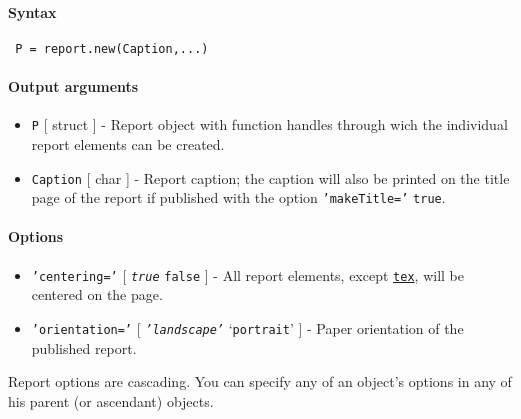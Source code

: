 


	\paragraph{Syntax}
 
 \begin{verbatim}
 P = report.new(Caption,...)
 \end{verbatim}
 
 \paragraph{Output arguments}
 
 \begin{itemize}
 \item
   \texttt{P} {[} struct {]} - Report object with function handles
   through wich the individual report elements can be created.
 \item
   \texttt{Caption} {[} char {]} - Report caption; the caption will also
   be printed on the title page of the report if published with the
   option \texttt{'makeTitle='} \texttt{true}.
 \end{itemize}
 
 \paragraph{Options}
 
 \begin{itemize}
 \item
   \texttt{'centering='} {[} \emph{\texttt{true}} \textbar{}
   \texttt{false} {]} - All report elements, except
   \href{report/tex}{\texttt{tex}}, will be centered on the page.
 \item
   \texttt{'orientation='} {[} \emph{\texttt{'landscape'}} \textbar{}
   `\texttt{portrait}' {]} - Paper orientation of the published report.
 \end{itemize}
 
 Report options are cascading. You can specify any of an object's options
 in any of his parent (or ascendant) objects.


